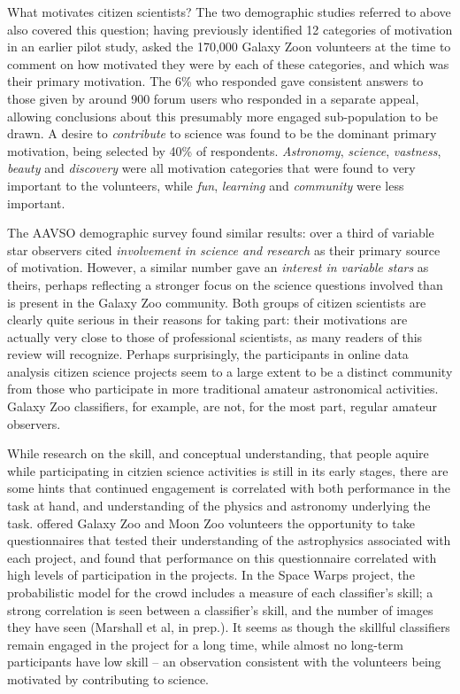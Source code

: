 \documentclass{ar2e}
\begin{document}
What motivates citizen scientists? The two demographic studies referred to above
also covered this question; having previously \citep{Rad++2010} identified 12
categories of motivation in an earlier pilot study, \citet{Rad++2013} asked the
170,000 Galaxy Zoon volunteers at the time to comment on how motivated they were
by each of these categories, and which was their primary motivation. The 6\% who
responded gave consistent answers to those given by around 900 forum users who
responded in a separate appeal, allowing conclusions about this presumably more
engaged sub-population to be drawn. A desire to {\it contribute} to science was
found to be the dominant primary motivation, being selected by 40\% of
respondents. {\it Astronomy}, {\it science}, {\it vastness}, {\it beauty} and 
{\it discovery} were all motivation categories that were found to very important
to the volunteers, while {\it fun}, {\it learning} and {\it community} were less
important. 

The AAVSO demographic survey \citep{P+P2012} found similar results: over a third
of variable star observers cited {\it involvement in science and research} as
their primary source of motivation. However, a similar number gave an {\it
interest in variable stars} as theirs, perhaps reflecting a stronger focus on
the science questions involved than is present in the Galaxy Zoo community. Both
groups of citizen scientists are clearly quite serious in their reasons for
taking part: their motivations are actually very close to those of professional
scientists, as many readers of this review will recognize. Perhaps surprisingly,
the participants in online data analysis citizen science projects seem to a
large extent to be a distinct community from those who participate in more
traditional amateur astronomical activities. Galaxy Zoo classifiers, for
example, are not, for the most part, regular amateur observers. 

While research on the skill, and conceptual understanding, that  people aquire
while participating in citzien science activities is still in its early stages,
there are some hints that continued engagement is correlated with both
performance in the task at hand, and understanding of the physics and astronomy
underlying the task. \citet{Prather++2013} offered Galaxy Zoo and Moon Zoo
volunteers the opportunity to take questionnaires that tested their
understanding of the astrophysics associated with each project, and found that
performance on this questionnaire correlated with high levels of participation
in the projects. In the Space Warps project, the probabilistic model for the
crowd includes a measure of each classifier's skill; a strong correlation is
seen between a classifier's skill, and the number of images they have seen
(Marshall et al, in prep.). It seems as though the skillful classifiers remain
engaged in the project for a long time, while almost no long-term participants
have low skill -- an observation consistent with the volunteers being motivated
by contributing to science.
\end{document}

